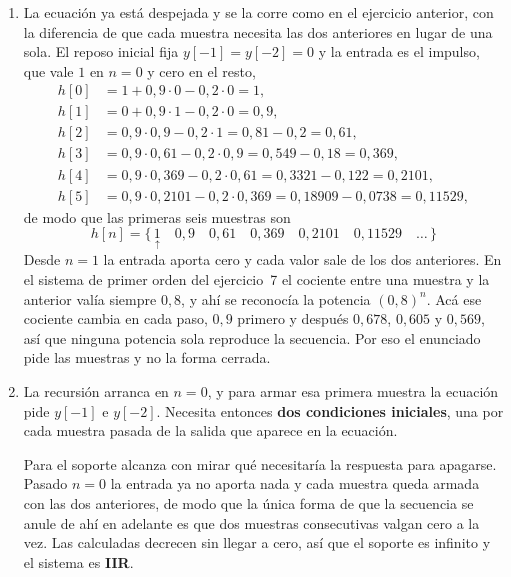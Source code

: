 \documentclass[10pt,a4paper]{article}
\begin{document}
	\begin{enumerate}
		\item La ecuación ya está despejada y se la corre
		como en el ejercicio anterior, con la diferencia de que cada muestra necesita las dos
		anteriores en lugar de una sola. El reposo inicial fija $y[-1]=y[-2]=0$ y la entrada
		es el impulso, que vale $1$ en $n=0$ y cero en el resto,
		\[
			\begin{aligned}
			h[0] &= 1 + 0{,}9\cdot 0 - 0{,}2\cdot 0 = 1, \\
			h[1] &= 0 + 0{,}9\cdot 1 - 0{,}2\cdot 0 = 0{,}9, \\
			h[2] &= 0{,}9\cdot 0{,}9 - 0{,}2\cdot 1 = 0{,}81 - 0{,}2 = 0{,}61, \\
			h[3] &= 0{,}9\cdot 0{,}61 - 0{,}2\cdot 0{,}9 = 0{,}549 - 0{,}18 = 0{,}369, \\
			h[4] &= 0{,}9\cdot 0{,}369 - 0{,}2\cdot 0{,}61 = 0{,}3321 - 0{,}122 = 0{,}2101, \\
			h[5] &= 0{,}9\cdot 0{,}2101 - 0{,}2\cdot 0{,}369 = 0{,}18909 - 0{,}0738 = 0{,}11529,
			\end{aligned}
		\]
		de modo que las primeras seis muestras son
		\[
			\boxed{\;h[n] = \{\, \underset{\uparrow}{1} \quad 0{,}9 \quad 0{,}61 \quad
			0{,}369 \quad 0{,}2101 \quad 0{,}11529 \quad \ldots \,\}\;}
		\]
		Desde $n=1$ la entrada aporta cero y cada valor sale de los dos anteriores. En el
		sistema de primer orden del ejercicio~7 el cociente entre una muestra y la anterior
		valía siempre $0{,}8$, y ahí se reconocía la potencia $(0{,}8)^n$. Acá ese cociente
		cambia en cada paso, $0{,}9$ primero y después $0{,}678$, $0{,}605$ y $0{,}569$, así
		que ninguna potencia sola reproduce la secuencia. Por eso el enunciado pide las
		muestras y no la forma cerrada.

		\item La recursión arranca en $n=0$,
		y para armar esa primera muestra la ecuación pide $y[-1]$ e $y[-2]$. Necesita
		entonces \textbf{dos condiciones iniciales}, una por cada muestra pasada de la salida
		que aparece en la ecuación.

		Para el soporte alcanza con mirar qué necesitaría la respuesta para apagarse. Pasado
		$n=0$ la entrada ya no aporta nada y cada muestra queda armada con las dos
		anteriores, de modo que la única forma de que la secuencia se anule de ahí en
		adelante es que dos muestras consecutivas valgan cero a la vez. Las calculadas
		decrecen sin llegar a cero, así que el soporte es infinito y el sistema es
		\textbf{IIR}.


\end{enumerate}
\end{document}
